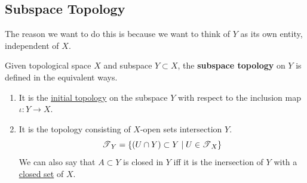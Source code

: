 \subsection{Subspace Topology} 

  The reason we want to do this is because we want to think of $Y$ as its own entity, independent of $X$. 

  \begin{definition}
    \label{def:subspace-topology}
    Given topological space $X$ and subspace $Y \subset X$, the \textbf{subspace topology} on $Y$ is defined in the equivalent ways. 
    \begin{enumerate}
      \item It is the \hyperref[def:initial-topology]{initial topology} on the subspace $Y$ with respect to the inclusion map $\iota: Y \rightarrow X$. 
      \item It is the topology consisting of $X$-open sets intersection $Y$.
      \begin{equation}
        \operatorname{\mathscr{T}}_Y = \{(U \cap Y) \subset Y \mid U \in \operatorname{\mathscr{T}}_X\}
      \end{equation}
      We can also say that $A \subset Y$ is closed in $Y$ iff it is the inersection of $Y$ with a \hyperref[def:closed]{closed set} of $X$. 
    \end{enumerate}

    \begin{figure}[H]
      \centering
      \begin{subfigure}[b]{0.48\textwidth}
        \centering
\end{subfigure}
\end{figure}
\end{definition}
